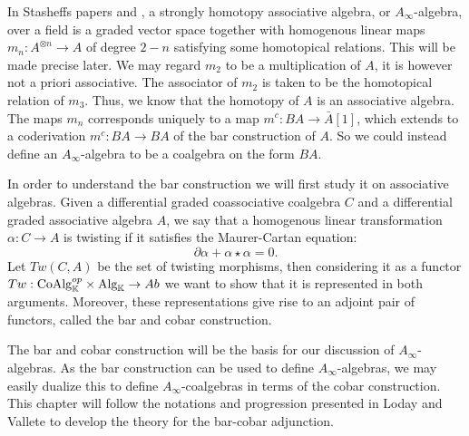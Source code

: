 \documentclass[../thesis.tex]{subfiles}
\begin{document}
        In Stasheffs papers \cite{Stasheff63I} and \cite{Stasheff63II}, a strongly homotopy associative algebra, or $A_\infty$-algebra, over a field is a graded vector space together with homogenous linear maps $m_n:A^{\otimes n}\rightarrow A$ of degree $2-n$ satisfying some homotopical relations. This will be made precise later. We may regard $m_2$ to be a multiplication of $A$, it is however not a priori associative. The associator of $m_2$ is taken to be the homotopical relation of $m_3$. Thus, we know that the homotopy of $A$ is an associative algebra. The maps $m_n$ corresponds uniquely to a map $m^c:BA\rightarrow \bar{A}[1]$, which extends to a coderivation $m^c : BA\rightarrow BA$ of the bar construction of $A$. So we could instead define an $A_\infty$-algebra to be a coalgebra on the form $BA$.


        In order to understand the bar construction we will first study it on associative algebras. Given a differential graded coassociative coalgebra $C$ and a differential graded associative algebra $A$, we say that a homogenous linear transformation $\alpha: C\rightarrow A$ is twisting if it satisfies the Maurer-Cartan equation:
            \begin{equation*}
                \partial\alpha + \alpha\star\alpha = 0.
            \end{equation*}
        Let $Tw(C,A)$ be the set of twisting morphisms, then considering it as a functor $Tw : \tt{CoAlg}_{\mathbb{K}}^{op}\times \tt{Alg}_{\mathbb{K}} \rightarrow Ab$ we want to show that it is represented in both arguments. Moreover, these representations give rise to an adjoint pair of functors, called the bar and cobar construction.

        \begin{center}
        \end{center}

        The bar and cobar construction will be the basis for our discussion of $A_\infty$-algebras. As the bar construction can be used to define $A_\infty$-algebras, we may easily dualize this to define $A_\infty$-coalgebras in terms of the cobar construction. This chapter will follow the notations and progression presented in Loday and Vallete \cite{Loday12} to develop the theory for the bar-cobar adjunction.
\end{document}
